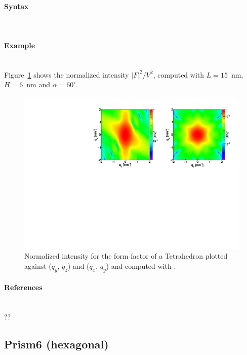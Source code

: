 \paragraph{Syntax}\strut\\

\paragraph{Example}\strut\\
Figure~\ref{fig:FFtetrahEx} shows the normalized intensity
$|F|^2/V^2$, computed with $L=15$~nm, $H=6$~nm and $\alpha =60
^{\circ}$.

\begin{figure}[ht]
\begin{center}
\includegraphics[angle=-90,width=\textwidth]{fig/ff/figfftetrahedron.pdf}
\end{center}
\caption{Normalized intensity for the form factor of a Tetrahedron
  plotted against ($q_y$, $q_z$) and  ($q_x$, $q_y$) and
  computed with .}
\label{fig:FFtetrahEx}
\end{figure}

\paragraph{References}\strut\\
??

\newpage
\subsection{Prism6 (hexagonal)} 

